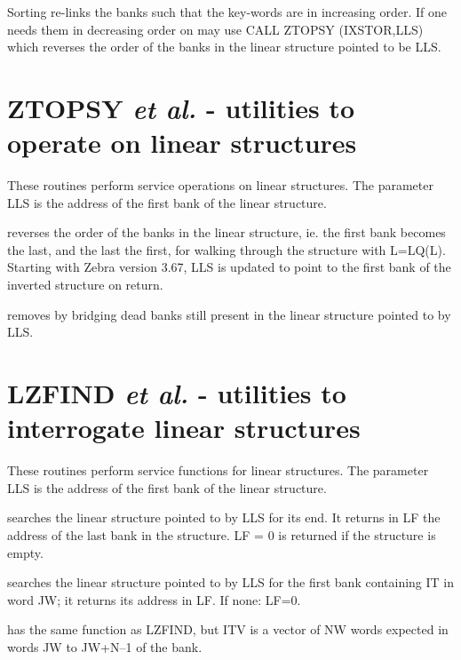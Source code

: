 Sorting re-links the banks such that the key-words are in
increasing order.
If one needs them in decreasing order on may use
CALL ZTOPSY (IXSTOR,LLS)
which reverses the order of the banks in the linear structure
pointed to be LLS.

\section{ZTOPSY {\it et al.} - utilities to operate on linear structures}

These routines perform service operations
on linear structures.
The parameter LLS is the address of the first bank
of the linear structure.



reverses the order of the banks in the linear structure,
ie. the first bank becomes the last, and the last the first,
for walking through the structure with L=LQ(L).
Starting with Zebra version 3.67, LLS is updated to point to
the first bank of the inverted structure on return.


removes by bridging dead banks still present
in the linear structure pointed to by LLS.

\section{LZFIND {\it et al.} - utilities to interrogate linear structures}

These routines perform service functions for linear structures.
The parameter LLS is the address of the first bank
of the linear structure.


searches the linear structure pointed to by LLS for its end.
It returns in LF the address of the last bank in the structure.
LF = 0 is returned if the structure is empty.


searches the linear structure pointed to by LLS
for the first bank containing IT in word JW;
it returns its address in LF.
If none:  LF=0.


has the same function as LZFIND,
but ITV is a vector of NW words expected
in words JW to JW+N--1 of the bank.

